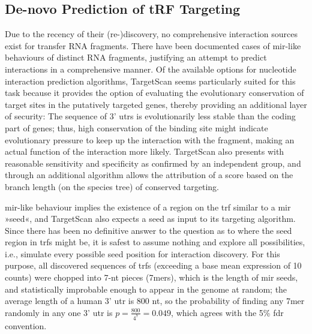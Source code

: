 \subsection{De-novo Prediction of tRF Targeting} \label{sec:database:trf-targeting}
Due to the recency of their (re-)discovery, no comprehensive interaction sources exist for transfer RNA fragments. There have been documented cases of \ac{mir}-like behaviours of distinct RNA fragments,\cite{Cole2009,Kumar2014} justifying an attempt to predict interactions in a comprehensive manner. Of the available options for nucleotide interaction prediction algorithms, TargetScan\cite{Friedman2009} seems particularly suited for this task because it provides the option of evaluating the evolutionary conservation of target sites in the putatively targeted genes, thereby providing an additional layer of security: The sequence of 3' \acp{utr} is evolutionarily less stable than the coding part of genes; thus, high conservation of the binding site might indicate evolutionary pressure to keep up the interaction with the fragment, making an actual function of the interaction more likely. TargetScan also presents with reasonable sensitivity and specificity as confirmed by an independent group,\cite{Alexiou2009} and through an additional algorithm allows the attribution of a score based on the branch length (on the species tree) of conserved targeting.\cite{Agarwal2015}

\ac{mir}-like behaviour implies the existence of a region on the \ac{trf} similar to a \ac{mir} »seed«, and TargetScan also expects a seed as input to its targeting algorithm. Since there has been no definitive answer to the question as to where the seed region in \acp{trf} might be, it is safest to assume nothing and explore all possibilities, i.e., simulate every possible seed position for interaction discovery. For this purpose, all discovered sequences of \acp{trf} (exceeding a base mean expression of 10 counts) were chopped into 7-nt pieces (7mers), which is the length of \ac{mir} seeds, and statistically improbable enough to appear in the genome at random; the average length of a human 3' \ac{utr} is 800 \ac{nt}, so the probability of finding any 7mer randomly in any one 3' \ac{utr} is $p = \frac{800}{4^7} = 0.049$, which agrees with the 5\% \ac{fdr} convention.


